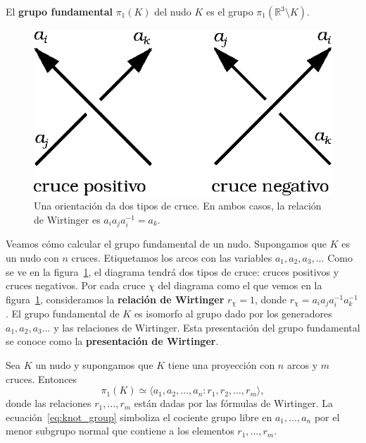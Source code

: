 \documentclass[graybox]{svmult}
\newcommand{\R}{\mathbb{R}}
\begin{document}
\begin{definition}
    El \textbf{grupo fundamental} $\pi_1(K)$ del nudo $K$ es el grupo 
    $\pi_1(\R^3\setminus K)$. 
\end{definition}
    \label{block:Wirtinger}
	\begin{figure}
   		\centering
	    \includegraphics[scale=0.6]{images/crossings}
        \caption{Una orientación da dos tipos de
        cruce. En ambos casos, la relación de Wirtinger es $a_ia_ja_i^{-1}=a_k$.}
        \label{fig:crossings}
    \end{figure}

    Veamos cómo calcular el grupo fundamental de un nudo.  Supongamos que $K$
    es un nudo con $n$ cruces.  Etiquetamos los arcos con las variables
    $a_1,a_2,a_3,\dots$ Como se ve en la figura~\ref{fig:crossings}, el
    diagrama tendrá dos tipos de cruce: cruces positivos y cruces negativos.
    Por cada cruce $\chi$ del diagrama como el que vemos en la
    figura~\ref{fig:crossings}, consideramos la \textbf{relación de Wirtinger}
    $r_\chi=1$, donde 
    $r_\chi = a_ia_ja_i^{-1}a_k^{-1}$.
	El grupo fundamental de
    $K$ es isomorfo al grupo dado por los generadores $a_1,a_2,a_3\dots$ y
    las relaciones de Wirtinger.  Esta presentación del grupo
    fundamental se conoce como la \textbf{presentación de Wirtinger}.

    \begin{theorem}[Wirtinger]
        Sea $K$ un nudo y supongamos que $K$ tiene una proyección con $n$ arcos
        y $m$ cruces. Entonces
        \begin{equation}
            \label{eq:knot_group}
            \pi_1(K)\simeq \langle a_1,a_2,\dots,a_n : r_1,r_2,\dots,r_m\rangle,
        \end{equation}
        donde las relaciones $r_1,\dots,r_m$ están dadas por las
        fórmulas de Wirtinger. La ecuación~\eqref{eq:knot_group}
        simboliza el cociente grupo libre en $a_1,\dots,a_n$ por el menor
        subgrupo normal que contiene a los elementos $r_1,\dots,r_m$. 
    \end{theorem}
\end{document}

